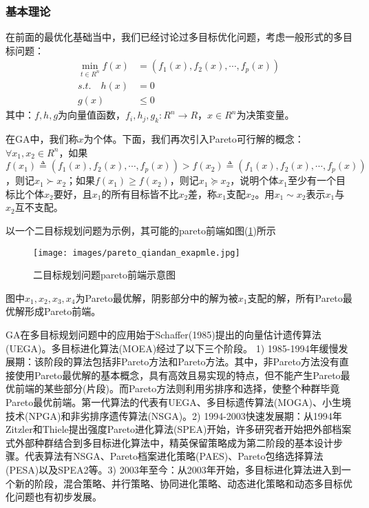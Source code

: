        \subsubsection{基本理论}
            \par
            在前面的最优化基础当中，我们已经讨论过多目标优化问题，考虑一般形式的多目标问题：
            \begin{align*}
            \mathop{\min}\limits_{t \in R^n}f(x)& =\left(f_1(x),f_2(x),\cdots,f_p(x)\right)\\
            s.t.\quad h(x)&=0\\
                     g(x)&\leqslant 0
            \end{align*}
            其中：$f,h,g$为向量值函数，$f_i,h_j,g_k:R^n\to R$，$x\in R^n$为决策变量。
            \par
            在GA中，我们称$x$为个体。下面，我们再次引入Pareto可行解的概念：$\forall x_1,x_2\in R^n$，如果$f(x_1)\triangleq \left(f_1(x),f_2(x),\cdots,f_p(x)\right)>f(x_2)\triangleq \left(f_1(x),f_2(x),\cdots,f_p(x)\right) $，则记$x_1\succ x_2$；如果$f(x_1)\geqslant f(x_2)$，则记$x_1\succeq  x_2$，说明个体$x_1$至少有一个目标比个体$x_2$要好，且$x_1$的所有目标皆不比$x_2$差，称$x_1$支配$x_2$。用$x_1 \sim x_2$表示$x_1$与$x_2$互不支配。
            \par
            以一个二目标规划问题为示例，其可能的pareto前端如图(\ref{二目标规划问题pareto前端示意图})所示
            \begin{figure}[H]
            \centering
            \texttt{[image: images/pareto\_qiandan\_exapmle.jpg]}
            \caption{二目标规划问题pareto前端示意图}
            \label{二目标规划问题pareto前端示意图}
            \end{figure}
            \par
            图中$x_1,x_2,x_3,x_4$为Pareto最优解，阴影部分中的解为被$x_1$支配的解，所有Pareto最优解形成Pareto前端。
            \par
            GA在多目标规划问题中的应用始于Schaffer(1985)提出的向量估计遗传算法(UEGA)。多目标进化算法(MOEA)经过了以下三个阶段。
            1) 1985-1994年缓慢发展期：该阶段的算法包括非Pareto方法和Pareto方法。其中，非Pareto方法没有直接使用Pareto最优解的基本概念，具有高效且易实现的特点，但不能产生Pareto最优前端的某些部分(片段)。而Pareto方法则利用劣排序和选择，使整个种群毕竟Pareto最优前端。第一代算法的代表有UEGA、多目标遗传算法(MOGA)、小生境技术(NPGA)和非劣排序遗传算法(NSGA)。2) 1994-2003快速发展期：从1994年Zitzler和Thiele提出强度Pareto进化算法(SPEA)开始，许多研究者开始把外部档案式外部种群结合到多目标进化算法中，精英保留策略成为第二阶段的基本设计步骤。代表算法有NSGA、Pareto档案进化策略(PAES)、Pareto包络选择算法(PESA)以及SPEA2等。3) 2003年至今：从2003年开始，多目标进化算法进入到一个新的阶段，混合策略、并行策略、协同进化策略、动态进化策略和动态多目标优化问题也有初步发展。
